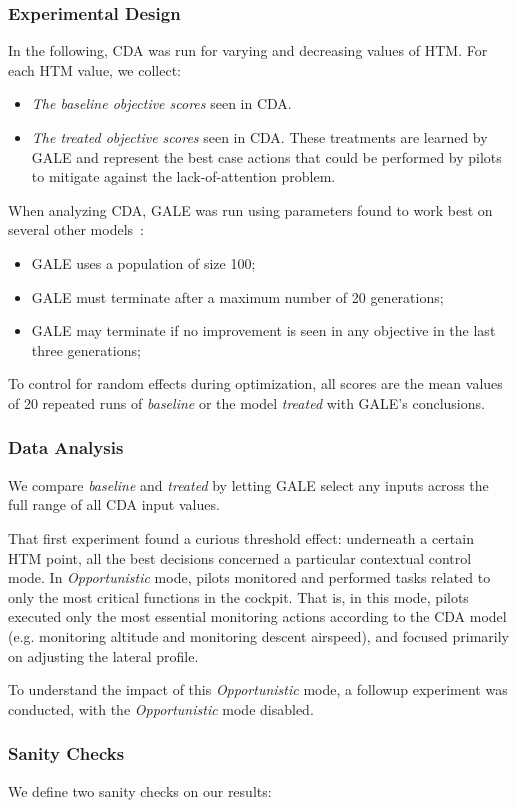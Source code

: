\documentclass[journal]{IEEEtran}
\newcommand{\bi}{\begin{itemize}}
\newcommand{\ei}{\end{itemize}}
\begin{document}
\subsubsection{Experimental Design}

In  the following, CDA was run for varying and decreasing values of HTM.
For each HTM value, we collect:
\bi
\item {\em The  baseline objective scores} seen in CDA. 
\item {\em The treated objective scores} seen in CDA. These treatments are learned
by GALE and represent the best case actions that could be performed by pilots
to mitigate against the lack-of-attention problem.
\ei

When analyzing CDA, GALE was run using  parameters found to work best on several other models~\cite{krallphd}:
\bi
\item GALE uses a population of size 100;
\item GALE must  terminate after a maximum number of 20 generations;
\item GALE may terminate if no improvement is seen in any objective in the last three generations;
\ei
To control for random effects during optimization, all scores are the mean values of 20 repeated runs of {\em baseline} or  the model {\em treated} with GALE's conclusions.

\subsubsection{Data Analysis}
We  compare {\em baseline} and {\em treated} by letting GALE select any inputs across the full range of all CDA input values.
 
That first experiment found a curious threshold effect: underneath a certain HTM point, all the best decisions concerned a particular contextual control mode.  
In  {\em Opportunistic} mode, pilots monitored and performed tasks related to only the most critical functions in the cockpit. 
That is, in this mode, pilots executed only the most essential monitoring actions according to the CDA model (e.g. monitoring altitude and monitoring descent airspeed), and focused primarily on adjusting the lateral profile.  
 

To  understand the impact of this {\em Opportunistic} mode, a followup  
experiment   was conducted,  with the {\em Opportunistic} mode  disabled.

\subsubsection{Sanity Checks}
We define two  sanity checks on our results:
\end{document}
